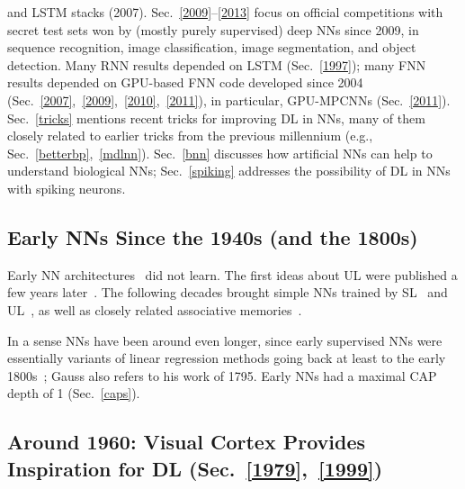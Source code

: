 \documentclass[letterpaper]{article}
\begin{document}
\begin{sloppypar}
and LSTM stacks (2007).
Sec.~\ref{2009}--\ref{2013} focus on official competitions with secret test sets 
won by (mostly purely supervised) deep NNs since 2009,
in sequence recognition, image classification, image segmentation, and object detection.
Many RNN results depended on LSTM (Sec.~\ref{1997});
many FNN results depended on GPU-based FNN code developed since 2004 (Sec.~\ref{2007},~\ref{2009},~\ref{2010},~\ref{2011}),
in particular, GPU-MPCNNs  (Sec.~\ref{2011}). 
Sec.~\ref{tricks} mentions
recent tricks for improving DL in NNs, many of them closely
related to earlier tricks from the previous millennium (e.g., Sec.~\ref{betterbp},~\ref{mdlnn}).
Sec.~\ref{bnn} discusses how artificial NNs can  help to understand biological NNs;
Sec.~\ref{spiking} addresses the possibility of DL in NNs with spiking neurons.
 





\subsection{Early NNs Since the 1940s (and the 1800s)}
\label{1940}

Early NN architectures~\citep{mcculloch:43} did not learn.
The first ideas about UL were published a few years later~\citep{Hebb:49}.
The following decades brought simple NNs trained by SL~\citep[e.g.,][]{rosenblatt1958,Rosenblatt:62,adaline62,Narendra:74}
and UL~\citep[e.g.,][]{Grossberg69a,kohonen1972,malsburg1973,WillshawMalsburg:76},
as well as closely related associative memories~\citep[e.g.,][]{Palm:80,Hopfield:82}.

In a sense NNs have been around even longer, since
early supervised NNs  were essentially variants of 
linear regression methods going back at least to the early 1800s~\citep[e.g.,][]{legendre1805,gauss1809,gauss1821}; Gauss also refers to his work of 1795.
Early NNs had a maximal CAP depth of 1 (Sec.~\ref{caps}).



\subsection{Around 1960: Visual Cortex Provides Inspiration for DL (Sec.~\ref{1979},~\ref{1999})}
\label{1962}


\end{sloppypar}
\end{document}
